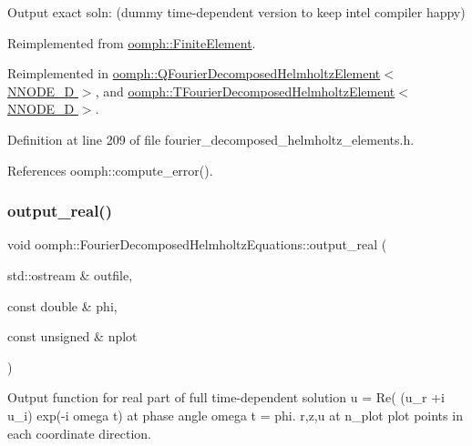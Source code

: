 Output exact soln\+: (dummy time-\/dependent version to keep intel compiler happy) 



Reimplemented from \hyperlink{classoomph_1_1FiniteElement_a2a8426dccd57b927be0ae0eec00d0479}{oomph\+::\+Finite\+Element}.



Reimplemented in \hyperlink{classoomph_1_1QFourierDecomposedHelmholtzElement_a3552971f652e8b07888071fd8ada95cc}{oomph\+::\+Q\+Fourier\+Decomposed\+Helmholtz\+Element$<$ N\+N\+O\+D\+E\+\_\+D $>$}, and \hyperlink{classoomph_1_1TFourierDecomposedHelmholtzElement_a0d7669c1d9028c760c2c77b0be927f97}{oomph\+::\+T\+Fourier\+Decomposed\+Helmholtz\+Element$<$ N\+N\+O\+D\+E\+\_\+D $>$}.



Definition at line 209 of file fourier\+\_\+decomposed\+\_\+helmholtz\+\_\+elements.\+h.



References oomph\+::compute\+\_\+error().

\mbox{\label{classoomph_1_1FourierDecomposedHelmholtzEquations_a6be7366b3597e5191ee9dbf872b7554c}} 
\subsubsection{\texorpdfstring{output\+\_\+real()}{output\_real()}}
{\footnotesize\ttfamily void oomph\+::\+Fourier\+Decomposed\+Helmholtz\+Equations\+::output\+\_\+real (\begin{DoxyParamCaption}\item[{std\+::ostream \&}]{outfile,  }\item[{const double \&}]{phi,  }\item[{const unsigned \&}]{nplot }\end{DoxyParamCaption})}



Output function for real part of full time-\/dependent solution u = Re( (u\+\_\+r +i u\+\_\+i) exp(-\/i omega t) at phase angle omega t = phi. r,z,u at n\+\_\+plot plot points in each coordinate direction. 

